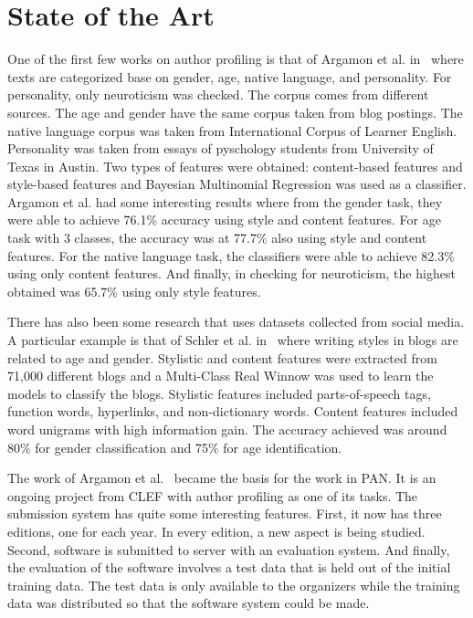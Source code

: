 \documentclass[a4paper]{llncs}
\begin{document}
\section{State of the Art}
One of the first few works on author profiling is that of Argamon et al. in~\cite{argamon2009automatically} where texts are categorized base on gender, age, native language, and personality. For personality, only neuroticism was checked. The corpus comes from different sources. The age and gender have the same corpus taken from blog postings. The native language corpus was taken from International Corpus of Learner English. Personality was taken from essays of pyschology students from University of Texas in Austin. Two types of features were obtained: content-based features and style-based features and Bayesian Multinomial Regression was used as a classifier. Argamon et al. had some interesting results where from the gender task, they were able to achieve 76.1\% accuracy using style and content features. For age task with 3 classes, the accuracy was at 77.7\% also using style and content features. For the native language task, the classifiers were able to achieve 82.3\% using only content features. And finally, in checking for neuroticism, the highest obtained was 65.7\% using only style features. 

There has also been some research that uses datasets collected from social media. A particular example is that of Schler et al. in~\cite{schler2006effects} where writing styles in blogs are related to age and gender. Stylistic and content features were extracted from 71,000 different blogs and a Multi-Class Real Winnow was used to learn the models to classify the blogs. Stylistic features included parts-of-speech tags, function words, hyperlinks, and non-dictionary words. Content features included word unigrams with high information gain. The accuracy achieved was around 80\% for gender classification and 75\% for age identification.  

The work of Argamon et al.~\cite{argamon2009automatically} became the basis for the work in PAN. It is an ongoing project from CLEF with author profiling as one of its tasks. The submission system has quite some interesting features. First, it now has three editions, one for each year. In every edition, a new aspect is being studied. Second, software is submitted to server with an evaluation system. And finally, the evaluation of the software involves a test data that is held out of the initial training data. The test data is only available to the organizers while the training data was distributed so that the software system could be made. 
\end{document}
